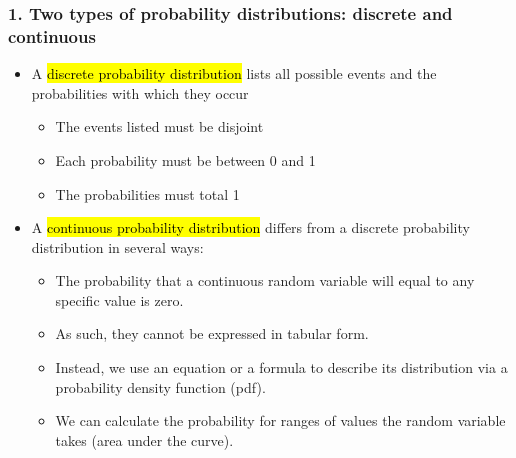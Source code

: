\documentclass[11pt,containsverbatim,handout,xcolor=xelatex,dvipsnames,table]{beamer}
\begin{document}

\begin{frame}
\frametitle{1. Two types of probability distributions: discrete and continuous}

\begin{itemize}

\item A \hl{discrete probability distribution} lists all possible events and the probabilities with which they occur
\begin{itemize}
\item The events listed must be disjoint
\item Each probability must be between 0 and 1 
\item The probabilities must total 1
\end{itemize}

\pause

\item A \hl{continuous probability distribution} differs from a discrete probability distribution in several ways:
\begin{itemize}
\item The probability that a continuous random variable will equal to any specific value is zero.
\item As such, they cannot be expressed in tabular form.
\item Instead, we use an equation or a formula to describe its distribution via a probability density function (pdf).
\item We can calculate the probability for ranges of values the random variable takes (area under the curve).
\end{itemize}

\end{itemize}

\end{frame}

\end{document}
